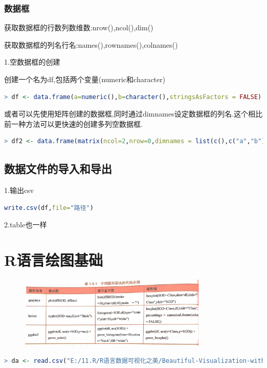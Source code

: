 \documentclass[11pt,a4paper,oneside]{book}
\begin{document}
\subsubsection{数据框}

获取数据框的行数列数维数:nrow(),ncol(),dim()

获取数据框的列名行名:names(),rownames(),colnames()

1.空数据框的创建

创建一个名为df,包括两个变量(numeric和character)
\begin{lstlisting}[language=r]
> df <- data.frame(a=numeric(),b=character(),stringsAsFactors = FALSE)
\end{lstlisting}

或者可以先使用矩阵创建的数据框,同时通过dimnames设定数据框的列名.这个相比前一种方法可以更快速的创建多列空数据框.
\begin{lstlisting}[language=r]
> df2 <- data.frame(matrix(ncol=2,nrow=0,dimnames = list(c(),c("a","b"))))
\end{lstlisting}

\subsection{数据文件的导入和导出}
1.输出csv
\begin{lstlisting}[language=r]
write.csv(df,file="路径")
\end{lstlisting}

2.table也一样

\section{R语言绘图基础}
\begin{figure}[H]
	\centering
	\includegraphics[width=0.8\textwidth]{screenshot004}
\end{figure}
\begin{lstlisting}[language=r]
> da <- read.csv("E:/11.R/R语言数据可视化之美/Beautiful-Visualization-with-R-master/第1章 R语言编程与绘图基础/Facet_Data.csv",stringsAsFactors=FALSE)
\end{lstlisting}
\end{document}
